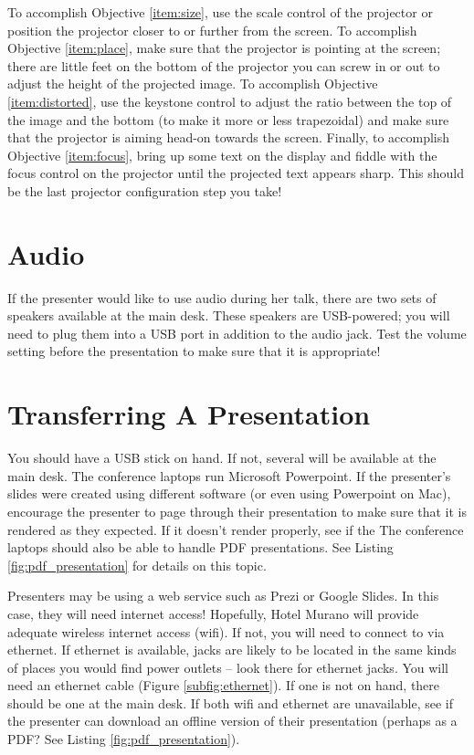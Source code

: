 \documentclass{scrartcl}
\begin{document}
To accomplish Objective \ref{item:size}, use the scale control of the projector or position the projector closer to or further from the screen. To accomplish Objective \ref{item:place}, make sure that the projector is pointing at the screen; there are little feet on the bottom of the projector you can screw in or out to adjust the height of the projected image. To accomplish Objective \ref{item:distorted}, use the keystone control to adjust the ratio between the top of the image and the bottom (to make it more or less trapezoidal) and make sure that the projector is aiming head-on towards the screen. Finally, to accomplish Objective \ref{item:focus}, bring up some text on the display and fiddle with the focus control on the projector until the projected text appears sharp. This should be the last projector configuration step you take!

\section{Audio}
If the presenter would like to use audio during her talk, there are two sets of speakers available at the main desk. These speakers are USB-powered; you will need to plug them into a USB port in addition to the audio jack. Test the volume setting before the presentation to make sure that it is appropriate!

\section{Transferring A Presentation} \label{sec:transferring}
You should have a USB stick on hand. If not, several will be available at the main desk. The conference laptops run Microsoft Powerpoint. If the presenter's slides were created using different software (or even using Powerpoint on Mac), encourage the presenter to page through their presentation to make sure that it is rendered as they expected. If it doesn't render properly, see if the The conference laptops should also be able to handle PDF presentations. See Listing \ref{fig:pdf_presentation} for details on this topic.

Presenters may be using a web service such as Prezi or Google Slides. In this case, they will need internet access! Hopefully, Hotel Murano will provide adequate wireless internet access (wifi). If not, you will need to connect to via ethernet. If ethernet is available, jacks are likely to be located in the same kinds of places you would find power outlets -- look there for ethernet jacks. You will need an ethernet cable (Figure \ref{subfig:ethernet}). If one is not on hand, there should be one at the main desk. If both wifi and ethernet are unavailable, see if the presenter can download an offline version of their presentation (perhaps as a PDF? See Listing \ref{fig:pdf_presentation}).
\end{document}
